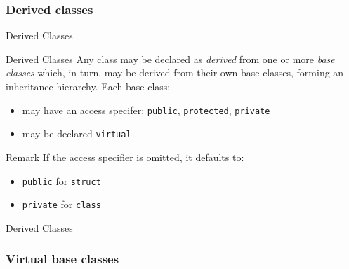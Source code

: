 \subsubsection{Derived classes}

\begin{frame}{Derived Classes}{}
  \begin{block}{Derived Classes}
    Any class may be declared as \emph{derived} from one or more \emph{base classes} which, in turn, may be derived from their own base classes, forming an inheritance hierarchy. Each base class:
    \begin{itemize}
    \item
      may have an access specifer: \lstinline!public!, \lstinline!protected!, \lstinline!private!
    \item
      may be declared \lstinline!virtual!
    \end{itemize}
  \end{block}

  \begin{block}{Remark}
    If the access specifier is omitted, it defaults to:
    \begin{itemize}
    \item
      \lstinline!public! for \lstinline!struct!
    \item
      \lstinline!private! for \lstinline!class!
    \end{itemize}
  \end{block}
\end{frame}

\begin{frame}{Derived Classes}{}
  \begin{example}
  \end{example}
\end{frame}


\subsubsection{Virtual base classes}

